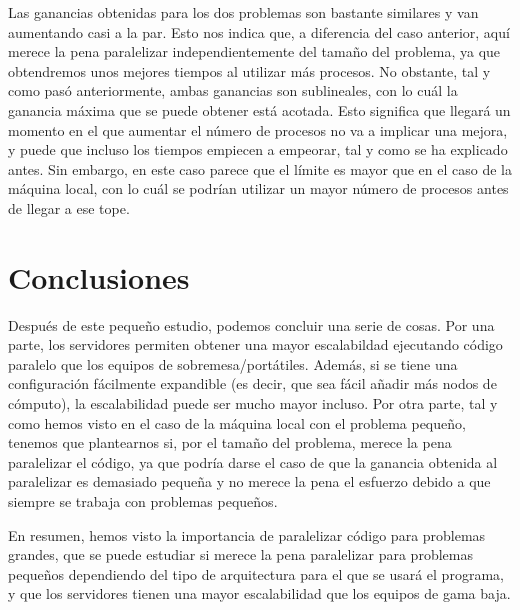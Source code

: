 \documentclass[11pt,a4paper]{article}
\begin{document}
Las ganancias obtenidas para los dos problemas son bastante similares y van aumentando
casi a la par. Esto nos indica que, a diferencia del caso anterior, aquí merece la pena
paralelizar independientemente del tamaño del problema, ya que obtendremos unos mejores
tiempos al utilizar más procesos. No obstante, tal y como pasó anteriormente, ambas
ganancias son sublineales, con lo cuál la ganancia máxima que se puede obtener está acotada.
Esto significa que llegará un momento en el que aumentar el número de procesos no va a implicar
una mejora, y puede que incluso los tiempos empiecen a empeorar, tal y como se ha explicado antes.
Sin embargo, en este caso parece que el límite es mayor que en el caso de la máquina local,
con lo cuál se podrían utilizar un mayor número de procesos antes de llegar a ese tope.

\section{Conclusiones}

Después de este pequeño estudio, podemos concluir una serie de cosas. Por una parte, los
servidores permiten obtener una mayor escalabildad ejecutando código paralelo que los equipos
de sobremesa/portátiles. Además, si se tiene una configuración fácilmente expandible (es decir,
que sea fácil añadir más nodos de cómputo), la escalabilidad puede ser mucho mayor incluso.
Por otra parte, tal y como hemos visto en el caso de la máquina local con el problema pequeño,
tenemos que plantearnos si, por el tamaño del problema, merece la pena paralelizar el código,
ya que podría darse el caso de que la ganancia obtenida al paralelizar es demasiado pequeña
y no merece la pena el esfuerzo debido a que siempre se trabaja con problemas pequeños.

En resumen, hemos visto la importancia de paralelizar código para problemas grandes, que se puede
estudiar si merece la pena paralelizar para problemas pequeños dependiendo del tipo de
arquitectura para el que se usará el programa, y que los servidores tienen una mayor escalabilidad
que los equipos de gama baja.
\end{document}
